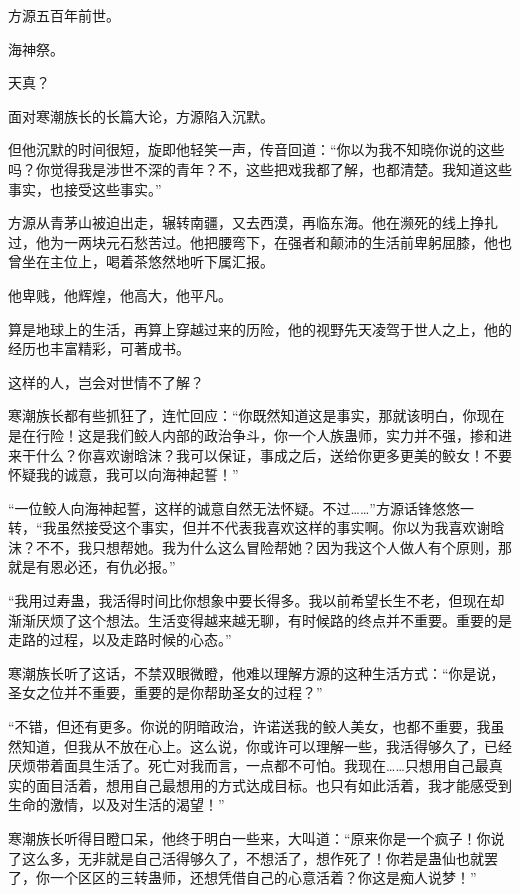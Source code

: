 
\begin{this_body}



方源五百年前世。

海神祭。

天真？

面对寒潮族长的长篇大论，方源陷入沉默。

但他沉默的时间很短，旋即他轻笑一声，传音回道：“你以为我不知晓你说的这些吗？你觉得我是涉世不深的青年？不，这些把戏我都了解，也都清楚。我知道这些事实，也接受这些事实。”

方源从青茅山被迫出走，辗转南疆，又去西漠，再临东海。他在濒死的线上挣扎过，他为一两块元石愁苦过。他把腰弯下，在强者和颠沛的生活前卑躬屈膝，他也曾坐在主位上，喝着茶悠然地听下属汇报。

他卑贱，他辉煌，他高大，他平凡。

算是地球上的生活，再算上穿越过来的历险，他的视野先天凌驾于世人之上，他的经历也丰富精彩，可著成书。

这样的人，岂会对世情不了解？

寒潮族长都有些抓狂了，连忙回应：“你既然知道这是事实，那就该明白，你现在是在行险！这是我们鲛人内部的政治争斗，你一个人族蛊师，实力并不强，掺和进来干什么？你喜欢谢晗沫？我可以保证，事成之后，送给你更多更美的鲛女！不要怀疑我的诚意，我可以向海神起誓！”

“一位鲛人向海神起誓，这样的诚意自然无法怀疑。不过……”方源话锋悠悠一转，“我虽然接受这个事实，但并不代表我喜欢这样的事实啊。你以为我喜欢谢晗沫？不不，我只想帮她。我为什么这么冒险帮她？因为我这个人做人有个原则，那就是有恩必还，有仇必报。”

“我用过寿蛊，我活得时间比你想象中要长得多。我以前希望长生不老，但现在却渐渐厌烦了这个想法。生活变得越来越无聊，有时候路的终点并不重要。重要的是走路的过程，以及走路时候的心态。”

寒潮族长听了这话，不禁双眼微瞪，他难以理解方源的这种生活方式：“你是说，圣女之位并不重要，重要的是你帮助圣女的过程？”

“不错，但还有更多。你说的阴暗政治，许诺送我的鲛人美女，也都不重要，我虽然知道，但我从不放在心上。这么说，你或许可以理解一些，我活得够久了，已经厌烦带着面具生活了。死亡对我而言，一点都不可怕。我现在……只想用自己最真实的面目活着，想用自己最想用的方式达成目标。也只有如此活着，我才能感受到生命的激情，以及对生活的渴望！”

寒潮族长听得目瞪口呆，他终于明白一些来，大叫道：“原来你是一个疯子！你说了这么多，无非就是自己活得够久了，不想活了，想作死了！你若是蛊仙也就罢了，你一个区区的三转蛊师，还想凭借自己的心意活着？你这是痴人说梦！”


\end{this_body}

